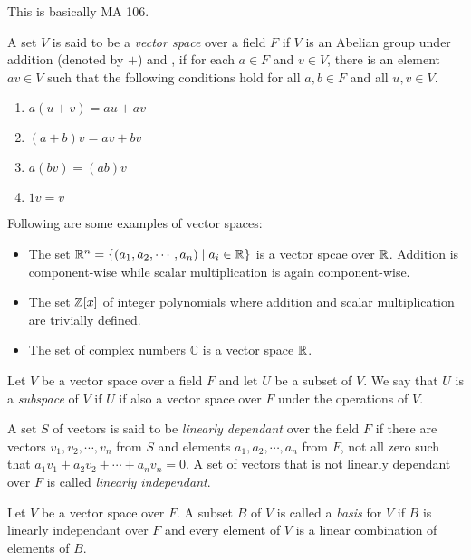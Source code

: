 This is basically MA 106.
\begin{definition}
	A set $V$ is said to be a \textit{vector space} over a field $F$ if $V$ is an Abelian group under addition (denoted by $+$) and , if for each $a\in F$ and $v\in V$, there is an element $av\in V$ such that the following conditions hold for all $a,b\in F$ and all $u,v\in V$.
	\begin{enumerate}
		\item $a(u+v) = au+av$
		\item $(a+b)v = av+bv$
		\item $a(bv) = (ab)v$
		\item $1v = v$
	\end{enumerate}
\end{definition}

Following are some examples of vector spaces:
\begin{itemize}
	\item The set $\mathbb{R}^n = \{(a_1,a_2,\cdots,a_n)\mid a_i\in\mathbb{R}\}$ is a vector spcae over $\mathbb{R}$. Addition is component-wise while scalar multiplication is again component-wise.
	\item The set $\mathbb{Z}[x]$ of integer polynomials where addition and scalar multiplication are trivially defined.
	\item The set of complex numbers $\mathbb{C}$ is a vector space $\mathbb{R}$.
\end{itemize}

\begin{definition}[Subspace]
	Let $V$ be a vector space over a field $F$ and let $U$ be a subset of $V$. We say that $U$ is a \textit{subspace} of $V$ if $U$ if also a vector space over $F$ under the operations of $V$.
\end{definition}

\begin{definition}
	A set $S$ of vectors is said to be \textit{linearly dependant} over the field $F$ if there are vectors $v_1,v_2,\cdots,v_n$ from $S$ and elements $a_1,a_2,\cdots,a_n$ from $F$, not all zero such that $a_1v_1+a_2v_2+\cdots+a_nv_n = 0$. A set of vectors that is not linearly dependant over $F$ is called \textit{linearly independant}.
\end{definition}

\begin{definition}[Basis]
	Let $V$ be a vector space over $F$. A subset $B$ of $V$ is called a \textit{basis} for $V$ if $B$ is linearly independant over $F$ and every element of $V$ is a linear combination of elements of $B$.
\end{definition}

